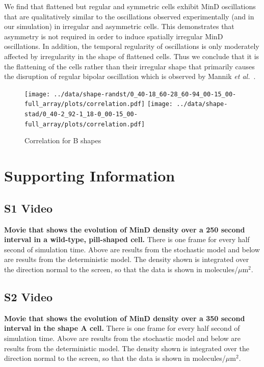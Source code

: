 \documentclass[10pt,letterpaper]{article}
\newcommand\micron{\ensuremath{\mu\text{m}}}
\begin{document}
We find that flattened but regular and symmetric cells exhibit MinD
oscillations that are qualitatively similar to the oscillations
observed experimentally (and in our simulation) in irregular and
asymmetric cells.  This demonstrates that asymmetry is not required in
order to induce spatially irregular MinD oscillations.  In addition,
the temporal regularity of oscillations is only moderately affected by
irregularity in the shape of flattened cells.  Thus we conclude that
it is the flattening of the cells rather than their irregular shape
that primarily causes the disruption of regular bipolar oscillation
which is observed by Mannik \emph{et al.}~\cite{mannik2012robustness}.

\begin{figure}
  \hspace{-3cm}
  \texttt{[image: ../data/shape-randst/0\_40-18\_60-28\_60-94\_00-15\_00-full\_array/plots/correlation.pdf]}
  \texttt{[image: ../data/shape-stad/0\_40-2\_92-1\_18-0\_00-15\_00-full\_array/plots/correlation.pdf]}
  \caption{Correlation for B shapes}
  \label{corr-B}
\end{figure}

\section*{Supporting Information}

\subsection*{S1 Video}
\label{movie-MinD-density-pill}
{\bf Movie that shows the evolution of MinD density over a 250 second
  interval in a wild-type, pill-shaped cell.}  There is one frame for
every half second of simulation time. Above are results from the
stochastic model and below are results from the deterministic model.
The density shown is integrated over the direction normal to the
screen, so that the data is shown in molecules/$\micron^2$.

\subsection*{S2 Video}
\label{movie-MinD-density-shape-A}
{\bf Movie that shows the evolution of MinD density over a 350 second
  interval in the shape A cell.}  There is one frame for every half
second of simulation time. Above are results from the stochastic model
and below are results from the deterministic model.  The density shown
is integrated over the direction normal to the screen, so that the
data is shown in molecules/$\micron^2$.
\end{document}
